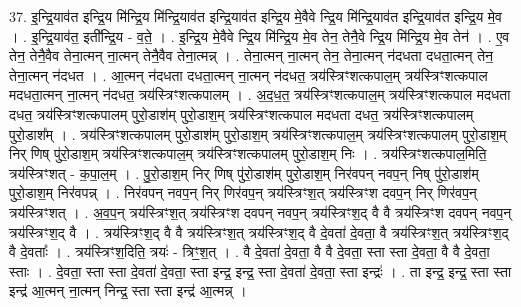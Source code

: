 \documentclass[17pt]{extarticle}
\begin{document}
37. इ॒न्द्रि॒याव॑त इन्द्रि॒य मि॑न्द्रि॒य मि॑न्द्रि॒याव॑त इन्द्रि॒याव॑त इन्द्रि॒य मे॒वैवे न्द्रि॒य मि॑न्द्रि॒याव॑त इन्द्रि॒याव॑त इन्द्रि॒य मे॒व । . इ॒न्द्रि॒याव॑त॒ इती᳚न्द्रि॒य - व॒ते॒ । . इ॒न्द्रि॒य मे॒वैवे न्द्रि॒य मि॑न्द्रि॒य मे॒व तेन॒ तेनै॒वे न्द्रि॒य मि॑न्द्रि॒य मे॒व तेन॑ । . ए॒व तेन॒ तेनै॒वैव तेना॒त्मन् ना॒त्मन् तेनै॒वैव तेना॒त्मन्न् । . तेना॒त्मन् ना॒त्मन् तेन॒ तेना॒त्मन् न॑दधता दधता॒त्मन् तेन॒ तेना॒त्मन् न॑दधत । . आ॒त्मन् न॑दधता दधता॒त्मन् ना॒त्मन् न॑दधत॒ त्रय॑स्त्रिꣳशत्कपाल॒म् त्रय॑स्त्रिꣳशत्कपाल मदधता॒त्मन् ना॒त्मन् न॑दधत॒ त्रय॑स्त्रिꣳशत्कपालम् । . अ॒द॒ध॒त॒ त्रय॑स्त्रिꣳशत्कपाल॒म् त्रय॑स्त्रिꣳशत्कपाल मदधता दधत॒ त्रय॑स्त्रिꣳशत्कपालम् पुरो॒डाश॑म् पुरो॒डाश॒म् त्रय॑स्त्रिꣳशत्कपाल मदधता दधत॒ त्रय॑स्त्रिꣳशत्कपालम् पुरो॒डाश᳚म् । . त्रय॑स्त्रिꣳशत्कपालम् पुरो॒डाश॑म् पुरो॒डाश॒म् त्रय॑स्त्रिꣳशत्कपाल॒म् त्रय॑स्त्रिꣳशत्कपालम् पुरो॒डाश॒म् निर् णिष् पु॑रो॒डाश॒म् त्रय॑स्त्रिꣳशत्कपाल॒म् त्रय॑स्त्रिꣳशत्कपालम् पुरो॒डाश॒म् निः । . त्रय॑स्त्रिꣳशत्कपाल॒मिति॒ त्रय॑स्त्रिꣳशत् - क॒पा॒ल॒म् । . पु॒रो॒डाश॒म् निर् णिष् पु॑रो॒डाश॑म् पुरो॒डाश॒म् निर॑वपन् नवप॒न् निष् पु॑रो॒डाश॑म् पुरो॒डाश॒म् निर॑वपन्न् । . निर॑वपन् नवप॒न् निर् णिर॑वप॒न् त्रय॑स्त्रिꣳश॒त् त्रय॑स्त्रिꣳश दवप॒न् निर् णिर॑वप॒न् त्रय॑स्त्रिꣳशत् । . अ॒व॒प॒न् त्रय॑स्त्रिꣳश॒त् त्रय॑स्त्रिꣳश दवपन् नवप॒न् त्रय॑स्त्रिꣳश॒द् वै वै त्रय॑स्त्रिꣳश दवपन् नवप॒न् त्रय॑स्त्रिꣳश॒द् वै । . त्रय॑स्त्रिꣳश॒द् वै वै त्रय॑स्त्रिꣳश॒त् त्रय॑स्त्रिꣳश॒द् वै दे॒वता॑ दे॒वता॒ वै त्रय॑स्त्रिꣳश॒त् त्रय॑स्त्रिꣳश॒द् वै दे॒वताः᳚ । . त्रय॑स्त्रिꣳश॒दिति॒ त्रयः॑ - त्रिꣳ॒॒श॒त् । . वै दे॒वता॑ दे॒वता॒ वै वै दे॒वता॒ स्ता स्ता दे॒वता॒ वै वै दे॒वता॒ स्ताः । . दे॒वता॒ स्ता स्ता दे॒वता॑ दे॒वता॒ स्ता इन्द्र॒ इन्द्र॒ स्ता दे॒वता॑ दे॒वता॒ स्ता इन्द्रः॑ । . ता इन्द्र॒ इन्द्र॒ स्ता स्ता इन्द्र॑ आ॒त्मन् ना॒त्मन् निन्द्र॒ स्ता स्ता इन्द्र॑ आ॒त्मन्न् । \newline
\end{document}
